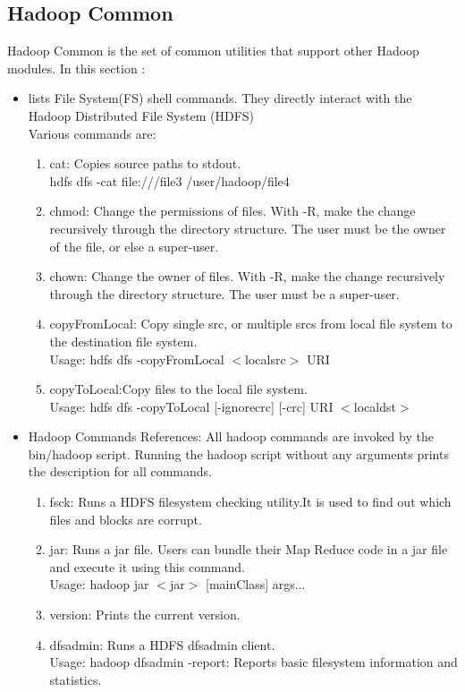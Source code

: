 \documentclass[12pt]{book}
\begin{document}
\subsection{Hadoop Common}
Hadoop Common is the set of common utilities that support other Hadoop modules.
In this section :
\begin{itemize}
 \item \cite{Features} lists File System(FS) shell commands. They directly interact with the Hadoop Distributed File System (HDFS)\\
 Various commands are:
 \begin{enumerate}
   \item cat: Copies source paths to stdout.\\
   \hspace{40mm} hdfs dfs -cat file:///file3 /user/hadoop/file4
   \item chmod: Change the permissions of files. With -R, make the change recursively through the directory structure. The user must be the owner of the file, or else a super-user.
   \item chown: Change the owner of files. With -R, make the change recursively through the directory structure. The user must be a super-user.
   \item copyFromLocal: Copy single src, or multiple srcs from local file system to the destination file system.\\
   Usage: hdfs dfs -copyFromLocal $<$localsrc$>$ URI
   \item copyToLocal:Copy files to the local file system.\\
   Usage: hdfs dfs -copyToLocal [-ignorecrc] [-crc] URI $<$localdst$>$
   \end{enumerate}

 \item Hadoop Commands References: All hadoop commands are invoked by the bin/hadoop script. Running the hadoop script without any arguments prints the description for all commands.
   \begin{enumerate}
   \item fsck: Runs a HDFS filesystem checking utility.It is used to find out which files and blocks are corrupt.
   \item jar: Runs a jar file. Users can bundle their Map Reduce code in a jar file and execute it using this command.\\
   Usage: hadoop jar $<$jar$>$ [mainClass] args...
   \item version: Prints the current version.
   \item dfsadmin: Runs a HDFS dfsadmin client.\\
   Usage: hadoop dfsadmin -report: Reports basic filesystem information and statistics.
   \end{enumerate}
\end{itemize}
\end{document}
